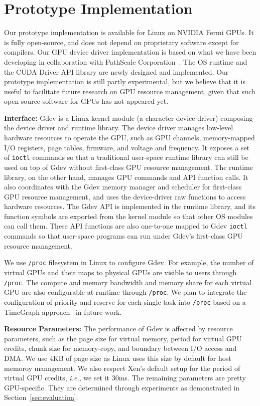 \section{Prototype Implementation}
\label{sec:prototype}

Our prototype implementation is available for Linux on NVIDIA Fermi GPUs.
It is fully open-source, and does not depend on proprietary software
except for compilers.
Our GPU device driver implementation is based on what we have been
developing in collaboration with PathScale Corporation~\cite{ENZO}.
The OS runtime and the CUDA Driver API library are newly designed and
implemented.
Our prototype implementation is still partly experimental, but we
believe that it is useful to facilitate future research on GPU
resource management, given that such open-source software for GPUs has
not appeared yet.

\textbf{Interface:}
Gdev is a Linux kernel module (a character device driver) composing the
device driver and runtime library.
The device driver manages low-level hardware resources to operate the
GPU, such as GPU channels, memory-mapped I/O registers, page tables,
firmware, and voltage and frequency.
It exposes a set of \texttt{ioctl} commands so that a traditional
user-space runtime library can still be used on top of Gdev without 
first-class GPU resource management.
The runtime library, on the other hand, manages GPU commands and API
function calls.
It also coordinates with the Gdev memory manager and scheduler for
first-class GPU resource management, and uses
the device-driver raw functions to access hardware resources.
The Gdev API is implemented in the runtime library, and its function
symbols are exported from the kernel module so that other OS modules can
call them.
These API functions are also one-to-one mapped to Gdev \texttt{ioctl}
commands so that user-space programs can run under Gdev's first-class
GPU resource management.

We use \texttt{/proc} filesystem in Linux to configure Gdev.
For example, the number of virtual GPUs and their maps to physical GPUs
are visible to users through \texttt{/proc}.
The compute and memory bandwidth and memory share for each virtual GPU
are also configurable at runtime through \texttt{/proc}.
We plan to integrate the configuration of priority and reserve for
each single task into \texttt{/proc} based on a TimeGraph
approach~\cite{Kato_ATC11} in future work.

\textbf{Resource Parameters:}
The performance of Gdev is affected by resource parameters, such as the
page size for virtual memory, period for virtual GPU credits, chunk size
for memory-copy, and boundary between I/O access and DMA.
We use 4KB of page size as Linux uses this size by default for host
memoroy management.
We also respect Xen's default setup for the period of virtual GPU
credits, \textit{i.e.}, we set it 30ms.
The remaining parameters are pretty GPU-specific.
They are determined through experiments as demonstrated in
Section~\ref{sec:evaluation}.

